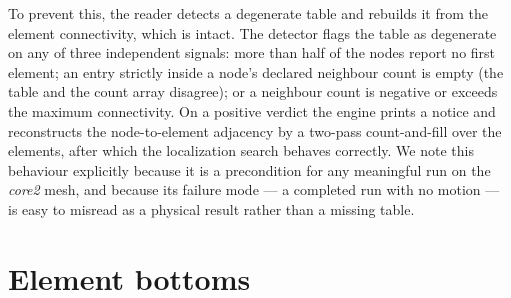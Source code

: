 To prevent this, the reader detects a degenerate table and rebuilds it from the
element connectivity, which is intact. The detector flags the table as degenerate on
any of three independent signals: more than half of the nodes report no first
element; an entry strictly inside a node's declared neighbour count is empty (the
table and the count array disagree); or a neighbour count is negative or exceeds the
maximum connectivity. On a positive verdict the engine prints a notice and
reconstructs the node-to-element adjacency by a two-pass count-and-fill over the
elements, after which the localization search behaves correctly. We note this
behaviour explicitly because it is a precondition for any meaningful run on the
\emph{core2} mesh, and because its failure mode --- a completed run with no motion
--- is easy to misread as a physical result rather than a missing table.


\section{Element bottoms}\label{sec:mesh-elem-bottoms}

